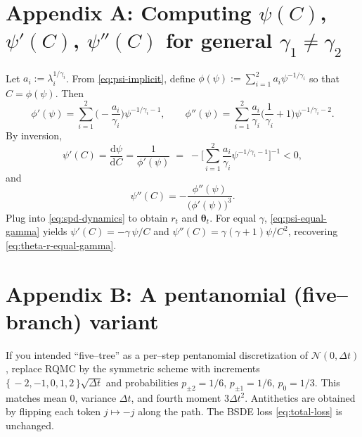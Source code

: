 \documentclass[11pt]{article}
\newcommand{\1}{\mathbbm{1}}
\newcommand{\dd}{\mathrm{d}}
\newcommand{\dt}{\Delta t}
\newcommand{\bs}{\boldsymbol}
\begin{document}
\section{Appendix A: Computing \(\psi(C)\), \(\psi'(C)\), \(\psi''(C)\) for general \(\gamma_1\neq\gamma_2\)}
Let \(a_i:=\lambda_i^{1/\gamma_i}\). From \eqref{eq:psi-implicit}, define \(\phi(\psi):=\sum_{i=1}^2 a_i \psi^{-1/\gamma_i}\) so that \(C=\phi(\psi)\).
Then
\begin{equation}
  \phi'(\psi) = \sum_{i=1}^2 \Big(-\frac{a_i}{\gamma_i}\Big)\psi^{-1/\gamma_i-1},\qquad
  \phi''(\psi) = \sum_{i=1}^2 \frac{a_i}{\gamma_i}\Big(\frac{1}{\gamma_i}+1\Big)\psi^{-1/\gamma_i-2}.
\end{equation}
By inversion,
\begin{equation}
  \psi'(C) = \frac{\dd \psi}{\dd C} = \frac{1}{\phi'(\psi)} 
  \;=\; -\Bigg[\sum_{i=1}^2 \frac{a_i}{\gamma_i}\psi^{-1/\gamma_i-1}\Bigg]^{-1} < 0,
\end{equation}
and
\begin{equation}
  \psi''(C) = -\frac{\phi''(\psi)}{\big(\phi'(\psi)\big)^3}.
\end{equation}
Plug into \eqref{eq:spd-dynamics} to obtain \(r_t\) and \(\bs\theta_t\). For equal \(\gamma\), \eqref{eq:psi-equal-gamma} yields \(\psi'(C)=-\gamma\,\psi/C\) and \(\psi''(C)=\gamma(\gamma+1)\psi/C^2\), recovering \eqref{eq:theta-r-equal-gamma}.

\section{Appendix B: A pentanomial (five--branch) variant}\label{subsec:pentanomial-variant}
If you intended ``five--tree'' as a per--step pentanomial discretization of \(\mathcal{N}(0,\dt)\), replace RQMC by the symmetric scheme with increments 
\(\{\,-2,-1,0,1,2\,\}\sqrt{\dt}\) and probabilities 
\(p_{\pm2}=1/6\), \(p_{\pm1}=1/6\), \(p_{0}=1/3\).
This matches mean \(0\), variance \(\dt\), and fourth moment \(3\dt^2\).
Antithetics are obtained by flipping each token \(j\mapsto -j\) along the path. The BSDE loss \eqref{eq:total-loss} is unchanged.
\end{document}
